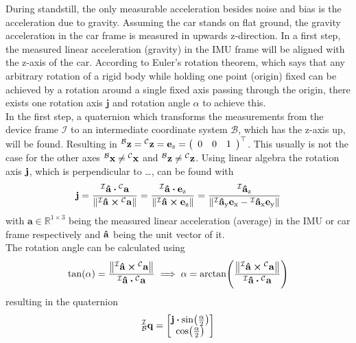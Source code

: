 During standstill, the only measurable acceleration besides noise and bias is the acceleration due to gravity.
Assuming the car stands on flat ground, the gravity acceleration in the car frame is measured in upwards z-direction.
In a first step, the measured linear acceleration (gravity) in the IMU frame will be aligned with the z-axis of the car.
According to Euler's rotation theorem, which says that any arbitrary rotation of a rigid body while holding one point (origin) fixed can be achieved by a rotation around a single fixed axis passing through the origin, there exists one rotation axis $\mathbf{j}$ and rotation angle $\alpha$ to achieve this.\\
In the first step, a quaternion  which transforms the measurements from the device frame $\mathcal{I}$ to an intermediate coordinate system $\mathcal{B}$, which has the z-axis up, will be found.
Resulting in $\vincs{z}{b} = \vincs{z}{c} = \mathbf{e}_\mathrm{z} = \left(\begin{array}{lll} 0 & 0 & 1 \end{array}\right)^{\top}$.
This usually is not the case for the other axes $\vincs{x}{b}\neq\vincs{x}{c}$ and $\vincs{z}{b}\neq\vincs{z}{c}$.
Using linear algebra  the rotation axis $\vb{j}$, which is perpendicular to \dots, can be found with
\begin{equation}
    \vb{j} = \frac{\vincs{\vu{a}}{i} \vdot \vincs{a}{c}}{\norm{\vincs{\vu{a}}{i} \cp \vincs{a}{c}}}
    = \frac{\vincs{\vu{a}}{i} \vdot \vb{e}_\mathrm{z} }{\norm{\vincs{\vu{a}}{i} \cp \vb{e}_\mathrm{z}}}
    = \frac{\vincs{\vu{a}_\mathrm{z}}{i}}{\norm{\vincs{\vu{a}_\mathrm{y}}{i}\vb{e}_\mathrm{x} - \vincs{\vu{a}_\mathrm{x}}{i}\vb{e}_\mathrm{y}}}
\end{equation}
with $\mathbf{a} \in \mathbb{R}^{1\times3}$ being the measured linear acceleration (average) in the IMU or car frame respectively and $\vu{a}$ being the unit vector of it.\\
The rotation angle can be calculated using
\begin{equation}
    \tan(\alpha) = \frac{\norm{\vincs{\vu{a}}{i} \cp \vincs{a}{c}}}{\vincs{\vu{a}}{i} \vdot \vincs{a}{c}} \implies
    \alpha = \arctan(\frac{\norm{\vincs{\vu{a}}{i} \cp \vincs{a}{c}}}{\vincs{\vu{a}}{i} \vdot \vincs{a}{c}})
\end{equation}
resulting in the quaternion
\begin{equation}
    \qtf{i}{b} =
    \begin{bmatrix}
        \vb{j}\vdot\sin(\frac{\alpha}{2}) \\
        \cos(\frac{\alpha}{2})
    \end{bmatrix}
\end{equation}

